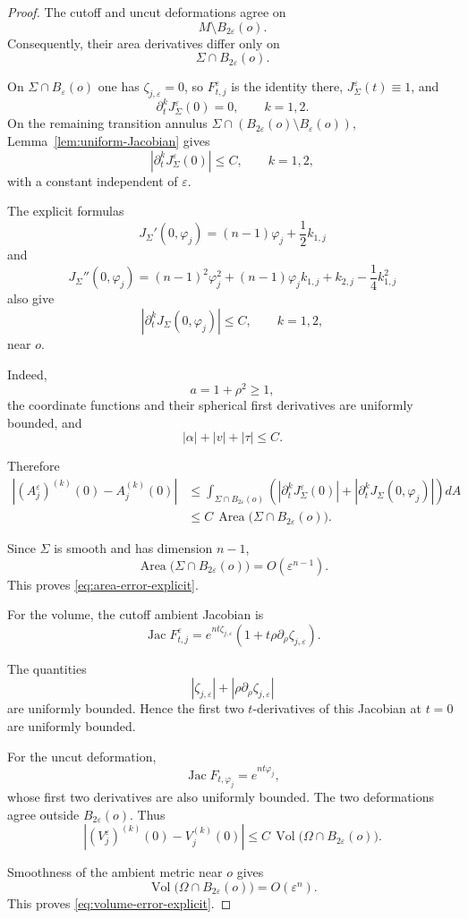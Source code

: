 \documentclass[11pt,reqno]{amsart}
\numberwithin{equation}{section}
\theoremstyle{definition}
\theoremstyle{remark}
\newcommand{\Area}{\operatorname{Area}}
\newcommand{\Vol}{\operatorname{Vol}}
\newcommand{\Jac}{\operatorname{Jac}}
\newcommand{\eps}{\varepsilon}
\begin{document}
\begin{proof}
The cutoff and uncut deformations agree on
\[
M\setminus B_{2\eps}(o).
\]
Consequently, their area derivatives differ only on
\[
\Sigma\cap B_{2\eps}(o).
\]

On \(\Sigma\cap B_\eps(o)\) one has
\(\zeta_{j,\eps}=0\), so \(F^\eps_{t,j}\) is the identity there,
\(J^\eps_\Sigma(t)\equiv1\), and
\[
\partial_t^kJ^\eps_\Sigma(0)=0,
\qquad k=1,2.
\]
On the remaining transition annulus
\(\Sigma\cap(B_{2\eps}(o)\setminus B_\eps(o))\),
Lemma~\ref{lem:uniform-Jacobian} gives
\[
\left|
\partial_t^kJ^\eps_\Sigma(0)
\right|
\le C,
\qquad
k=1,2,
\]
with a constant independent of \(\eps\).

The explicit formulas
\[
J_\Sigma'(0,\varphi_j)
=
(n-1)\varphi_j+\frac{1}{2}k_{1,j}
\]
and
\[
J_\Sigma''(0,\varphi_j)
=
(n-1)^2\varphi_j^2
+
(n-1)\varphi_jk_{1,j}
+
k_{2,j}
-
\frac{1}{4}k_{1,j}^2
\]
also give
\[
\left|
\partial_t^kJ_\Sigma(0,\varphi_j)
\right|
\le C,
\qquad
k=1,2,
\]
near \(o\).

Indeed,
\[
a=1+\rho^2\ge1,
\]
the coordinate functions and their spherical first derivatives are
uniformly bounded, and
\[
|\alpha|+|v|+|\tau|\le C.
\]

Therefore
\[
\begin{aligned}
\left|
(A^\eps_j)^{(k)}(0)-A_j^{(k)}(0)
\right|
&\le
\int_{\Sigma\cap B_{2\eps}(o)}
\left(
\left|\partial_t^kJ^\eps_\Sigma(0)\right|
+
\left|\partial_t^kJ_\Sigma(0,\varphi_j)\right|
\right)dA
\\
&\le
C\,
\Area\bigl(\Sigma\cap B_{2\eps}(o)\bigr).
\end{aligned}
\]

Since \(\Sigma\) is smooth and has dimension \(n-1\),
\[
\Area\bigl(\Sigma\cap B_{2\eps}(o)\bigr)
=
O(\eps^{n-1}).
\]
This proves \eqref{eq:area-error-explicit}.

For the volume, the cutoff ambient Jacobian is
\[
\Jac F^\eps_{t,j}
=
e^{nt\zeta_{j,\eps}}
\left(
1+t\rho\partial_\rho\zeta_{j,\eps}
\right).
\]

The quantities
\[
|\zeta_{j,\eps}|
+
|\rho\partial_\rho\zeta_{j,\eps}|
\]
are uniformly bounded. Hence the first two \(t\)-derivatives of this
Jacobian at \(t=0\) are uniformly bounded.

For the uncut deformation,
\[
\Jac F_{t,\varphi_j}
=
e^{nt\varphi_j},
\]
whose first two derivatives are also uniformly bounded. The two
deformations agree outside \(B_{2\eps}(o)\). Thus
\[
\left|
(V^\eps_j)^{(k)}(0)-V_j^{(k)}(0)
\right|
\le
C\,
\Vol\bigl(\Omega\cap B_{2\eps}(o)\bigr).
\]

Smoothness of the ambient metric near \(o\) gives
\[
\Vol\bigl(\Omega\cap B_{2\eps}(o)\bigr)
=
O(\eps^n).
\]
This proves \eqref{eq:volume-error-explicit}.
\end{proof}
\end{document}

